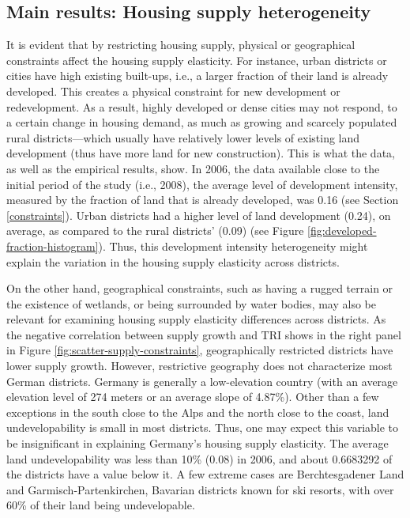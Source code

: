 \documentclass[
  12pt,
]{article}
\begin{document}
\subsection{Main results: Housing supply heterogeneity}\label{district-heterogeneity}

It is evident that by restricting housing supply, physical or geographical constraints affect the housing supply elasticity. For instance, urban districts or cities have high existing built-ups, i.e., a larger fraction of their land is already developed. This creates a physical constraint for new development or redevelopment. As a result, highly developed or dense cities may not respond, to a certain change in housing demand, as much as growing and scarcely populated rural districts---which usually have relatively lower levels of existing land development (thus have more land for new construction). This is what the data, as well as the empirical results, show. In 2006, the data available close to the initial period of the study (i.e., 2008), the average level of development intensity, measured by the fraction of land that is already developed, was 0.16 (see Section \ref{constraints}). Urban districts had a higher level of land development (0.24), on average, as compared to the rural districts' (0.09) (see Figure \ref{fig:developed-fraction-histogram}). Thus, this development intensity heterogeneity might explain the variation in the housing supply elasticity across districts.

On the other hand, geographical constraints, such as having a rugged terrain or the existence of wetlands, or being surrounded by water bodies, may also be relevant for examining housing supply elasticity differences across districts. As the negative correlation between supply growth and TRI shows in the right panel in Figure \ref{fig:scatter-supply-constraints}, geographically restricted districts have lower supply growth. However, restrictive geography does not characterize most German districts. Germany is generally a low-elevation country (with an average elevation level of 274 meters or an average slope of 4.87\%). Other than a few exceptions in the south close to the Alps and the north close to the coast, land undevelopability is small in most districts. Thus, one may expect this variable to be insignificant in explaining Germany's housing supply elasticity. The average land undevelopability was less than 10\% (0.08) in 2006, and about 0.6683292 of the districts have a value below it. A few extreme cases are Berchtesgadener Land and Garmisch-Partenkirchen, Bavarian districts known for ski resorts, with over 60\% of their land being undevelopable.
\end{document}
